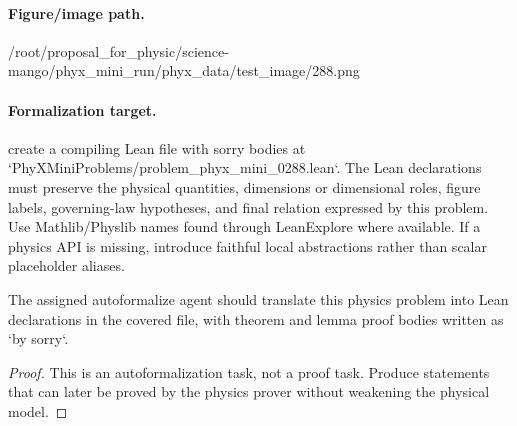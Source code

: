 \paragraph{Figure/image path.}
/root/proposal\_for\_physic/science-mango/phyx\_mini\_run/phyx\_data/test\_image/288.png

\paragraph{Formalization target.}
create a compiling Lean file with sorry bodies at `PhyXMiniProblems/problem\_phyx\_mini\_0288.lean`. The Lean declarations must preserve the physical quantities, dimensions or dimensional roles, figure labels, governing-law hypotheses, and final relation expressed by this problem.
Use Mathlib/Physlib names found through LeanExplore where available. If a physics API is missing, introduce faithful local abstractions rather than scalar placeholder aliases.

\begin{theorem}
\label{thm:physics:phyx_mini_0288:target}
The assigned autoformalize agent should translate this physics problem into Lean declarations in the covered file, with theorem and lemma proof bodies written as `by sorry`.
\end{theorem}
\begin{proof}
This is an autoformalization task, not a proof task. Produce statements that can later be proved by the physics prover without weakening the physical model.
\end{proof}

